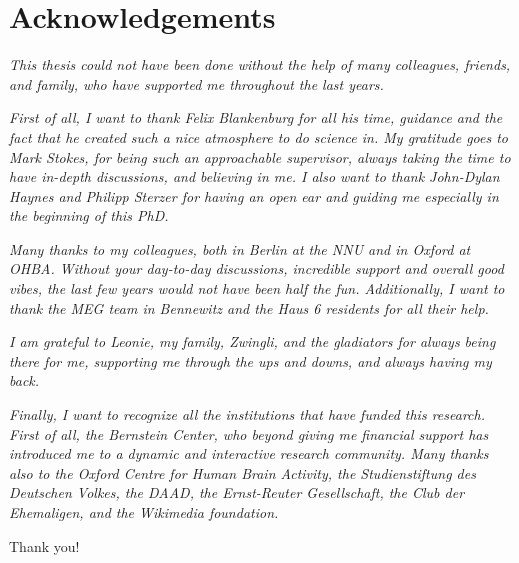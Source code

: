 
\chapter*{Acknowledgements}
\doublespacing
\textit{This thesis could not have been done without the help of many colleagues, friends, and family, who have supported me throughout the last years.} 

\textit{First of all, I want to thank Felix Blankenburg for all his time, guidance and the fact that he created such a nice atmosphere to do science in. My gratitude goes to Mark Stokes, for being such an approachable supervisor, always taking the time to have in-depth discussions, and believing in me. I also want to thank John-Dylan Haynes and Philipp Sterzer for having an open ear and guiding me especially in the beginning of this PhD.}

\textit{Many thanks to my colleagues, both in Berlin at the NNU and in Oxford at OHBA. Without your day-to-day discussions, incredible support and overall good vibes, the last few years would not have been half the fun.
Additionally, I want to thank the MEG team in Bennewitz and the Haus 6 residents for all their help.}

\textit{I am grateful to Leonie, my family, Zwingli, and the gladiators for always being there for me, supporting me through the ups and downs, and always having my back.}

\textit{Finally, I want to recognize all the institutions that have funded this research. First of all, the Bernstein Center, who beyond giving me financial support has introduced me to a dynamic and interactive research community. Many thanks also to the Oxford Centre for Human Brain Activity, the Studienstiftung des Deutschen Volkes, the DAAD, the Ernst-Reuter Gesellschaft, the Club der Ehemaligen, and the Wikimedia foundation.} 

Thank you!
